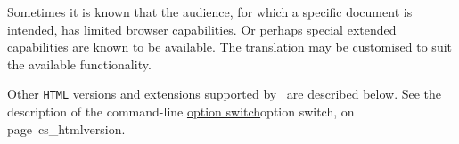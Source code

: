 %
%
%
%
%

\medskip\noindent
Sometimes it is known that the audience, for which a specific document 
is intended, has limited browser capabilities. 
Or perhaps special extended capabilities are known to be available.
The \latextohtml{} translation may be customised to suit the
available functionality.

\medskip\noindent
Other \texttt{HTML} versions and extensions 
supported by \latextohtml\ are described below.
See the description of the  command-line
\hyperref[page]{option switch}{option switch, on page~}{}{cs_htmlversion}.
%

